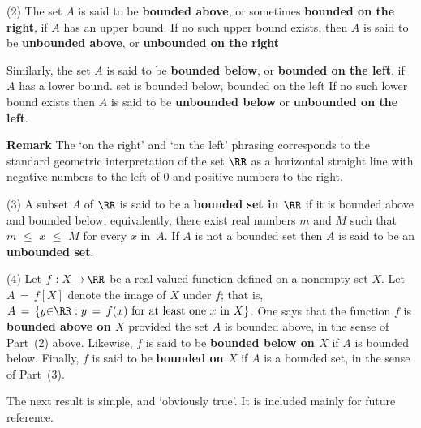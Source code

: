 \V

        (2) The set $A$ is said to be {\bf bounded above},
    or sometimes {\bf bounded on the right}, if $A$ has an upper bound. If no such upper bound exists, then $A$ is said to be {\bf unbounded above},
    or {\bf unbounded on the right}

        Similarly, the set $A$ is said to be {\bf bounded below}, or {\bf bounded on the left}, if $A$ has a lower bound.
    {set is bounded below, bounded on the left} If no such lower bound exists then
    $A$ is said to be {\bf unbounded below} or {\bf unbounded on the left}.

        {\bf Remark} The `on the right' and `on the left' phrasing corresponds to the standard geometric interpretation of the set ${\RR}$ as a horizontal straight line
    with negative numbers to the left of $0$ and positive numbers to the right.

\V

        (3) A subset $A$ of ${\RR}$ is said to be a {\bf bounded set in ${\RR}$}
    if it is bounded above and bounded below; equivalently, there exist real numbers $m$ and $M$ such that $m\,\,{\leq}\,\,x\,\,{\leq}\,\,M$ for every $x$ in~$A$.
    If $A$ is not a bounded set then $A$ is said to be an {\bf unbounded set}.


\V

        (4) Let $f:X \,{\rightarrow}\, {\RR}$ be a real-valued function defined on a nonempty set $X$.
     Let $A \,=\, f[X]$ denote the image of $X$ under $f$;
    that is, $A \,=\, \{y{\in}{\RR}: y \,=\, f(x) \mbox{ for at least one $x$ in $X$}\}$.
    One says that the function $f$ is {\bf bounded above on $X$} provided the set $A$ is bounded above, in the sense of Part~(2) above.
    Likewise, $f$ is said to be {\bf bounded below on $X$} if $A$ is bounded below.
    Finally, $f$ is said to be {\bf bounded on $X$} if $A$ is a bounded set, in the sense of Part~(3).

\VV

        The next result is simple, and `obviously true'. It is included mainly for future reference.

\V

